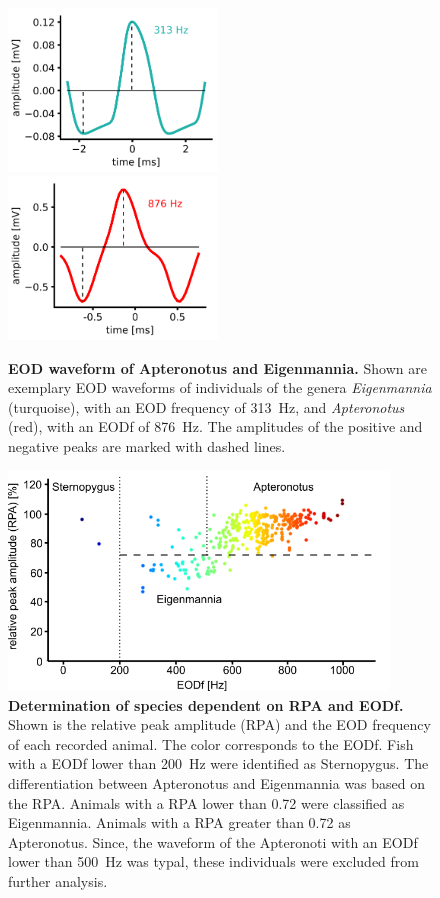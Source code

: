 \begin{figure}[H]
    \centering
    \includegraphics[width=0.496\textwidth]{pictures/Methods/waveform_eig.png}
    \includegraphics[width=0.496\textwidth]{pictures/Methods/waveform_apt.png}
    \caption{\textbf{EOD waveform of Apteronotus and Eigenmannia.} Shown are exemplary EOD waveforms of individuals of the genera \textit{Eigenmannia} (turquoise), with an EOD frequency of 313~Hz, and \textit{Apteronotus} (red), with an EODf of 876~Hz. The amplitudes of the positive and negative peaks are marked with dashed lines.}
    \label{fig:EOD_waveforms}
\end{figure}{}

\begin{figure}[H]
    \centering
    \includegraphics[width=0.9\textwidth]{pictures/Methods/cluster.png}
    \caption{\textbf{Determination of species dependent on RPA and EODf.} Shown is the relative peak amplitude (RPA) and the EOD frequency of each recorded animal. The color corresponds to the EODf. Fish with a EODf lower than 200~Hz were identified as Sternopygus. The differentiation between Apteronotus and Eigenmannia was based on the RPA. Animals with a RPA lower than 0.72 were classified as Eigenmannia. Animals with a RPA greater than 0.72 as Apteronotus. Since, the waveform of the Apteronoti with an EODf lower than 500~Hz was typal, these individuals were excluded from further analysis.}
    \label{fig:cluster}
\end{figure}{}